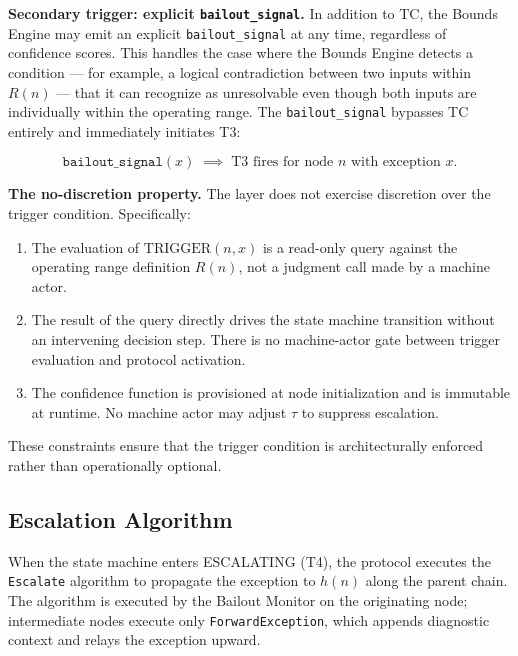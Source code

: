 \bigskip
\noindent\textbf{Secondary trigger: explicit \texttt{bailout\_signal}.} In addition to TC, the Bounds Engine may emit an explicit \texttt{bailout\_signal} at any time, regardless of confidence scores. This handles the case where the Bounds Engine detects a condition --- for example, a logical contradiction between two inputs within $R(n)$ --- that it can recognize as unresolvable even though both inputs are individually within the operating range. The \texttt{bailout\_signal} bypasses TC entirely and immediately initiates T3:

\begin{equation}
\texttt{bailout\_signal}(x) \;\implies\; \text{T3 fires for node } n \text{ with exception } x. \tag{TC-secondary}
\end{equation}

\bigskip
\noindent\textbf{The no-discretion property.} The \bounds{} layer does not exercise discretion over the trigger condition. Specifically:

\begin{enumerate}
    \item The evaluation of $\text{TRIGGER}(n, x)$ is a read-only query against the operating range definition $R(n)$, not a judgment call made by a machine actor.
    \item The result of the query directly drives the state machine transition without an intervening decision step. There is no machine-actor gate between trigger evaluation and protocol activation.
    \item The confidence function is provisioned at node initialization and is immutable at runtime. No machine actor may adjust $\tau$ to suppress escalation.
\end{enumerate}

These constraints ensure that the trigger condition is architecturally enforced rather than operationally optional.

\subsection{Escalation Algorithm}\label{sec:escalation-algorithm}

When the state machine enters ESCALATING (T4), the protocol executes the \texttt{Escalate} algorithm to propagate the exception to $h(n)$ along the parent chain. The algorithm is executed by the Bailout Monitor on the originating node; intermediate nodes execute only \texttt{ForwardException}, which appends diagnostic context and relays the exception upward.

